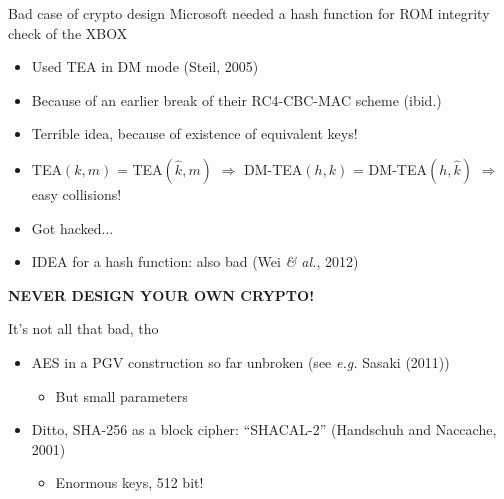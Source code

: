 \documentclass[xcolor=table,usenames,dvipsnames,compress]{beamer}
\newcommand\eg{\emph{e.g.}\xspace}
\newcommand\etal{\emph{\& al.}\xspace}
\begin{document}
\begin{frame}{Bad case of crypto design}
Microsoft needed a hash function for ROM integrity check of the XBOX
\begin{itemize}
\item Used TEA in DM mode (Steil, 2005)
\item {\footnotesize Because of an earlier break of their RC4-CBC-MAC scheme (ibid.)}
\item Terrible idea, because of existence of equivalent keys!
\item TEA$(k,m)$ = TEA$(\hat{k},m)$ $\Rightarrow$ DM-TEA$(h,k)$ = DM-TEA$(h,\hat{k})$ $\Rightarrow$ easy collisions!
\item Got hacked...
\item {\footnotesize IDEA for a hash function: also bad (Wei \etal, 2012)}
\end{itemize}

\medskip

\textbf{NEVER DESIGN YOUR OWN CRYPTO!}
\end{frame}

\begin{frame}{It's not all that bad, tho}
\begin{itemize}
\item AES in a PGV construction so far unbroken (see \eg Sasaki (2011))
\begin{itemize}
\item But small parameters \textinterrobang
\end{itemize}
\item Ditto, SHA-256 as a block cipher: ``SHACAL-2'' (Handschuh and Naccache, 2001)
\begin{itemize}
\item Enormous keys, 512 bit!
\end{itemize} 
\end{itemize}
\end{frame}
\end{document}
